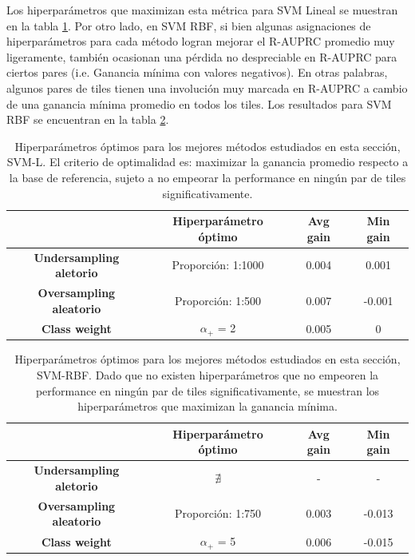 Los hiperparámetros que maximizan esta métrica para SVM Lineal se muestran en la tabla \ref{tab:best_hyp_svml}. Por otro lado, en SVM RBF, si bien algunas asignaciones de hiperparámetros para cada método logran mejorar el R-AUPRC promedio muy ligeramente, también ocasionan una pérdida no despreciable en R-AUPRC para ciertos pares (i.e. Ganancia mínima con valores negativos). En otras palabras, algunos pares de tiles tienen una involución muy marcada en R-AUPRC a cambio de una ganancia mínima promedio en todos los tiles. Los resultados para SVM RBF se encuentran en la tabla \ref{tab:best_hyp_svmk}.


\begin{table}[ht]
\centering
\begin{tabular}{c|c|c|c|}
\cline{2-4}
\textbf{}                                             & \textbf{Hiperparámetro óptimo} & \textbf{Avg gain} & \textbf{Min gain} \\ \hline
\multicolumn{1}{|c|}{\textbf{Undersampling aletorio}} & Proporción: 1:1000       & 0.004             & 0.001            \\ \hline
\multicolumn{1}{|c|}{\textbf{Oversampling aleatorio}} & Proporción: 1:500        & 0.007             & -0.001            \\ \hline
\multicolumn{1}{|c|}{\textbf{Class weight}}           & $\alpha_+$ = 2           & 0.005             & 0            \\ \hline
\end{tabular}
\caption{Hiperparámetros óptimos para los mejores métodos estudiados en esta sección, SVM-L. El criterio de optimalidad es: maximizar la ganancia promedio respecto a la base de referencia, sujeto a no empeorar la performance en ningún par de tiles significativamente.}
\label{tab:best_hyp_svml}
\end{table}

 
\begin{table}[ht]
\centering
\begin{tabular}{c|c|c|c|}
\cline{2-4}
\textbf{}                                             & \textbf{Hiperparámetro óptimo} & \textbf{Avg gain} & \textbf{Min gain} \\ \hline
\multicolumn{1}{|c|}{\textbf{Undersampling aletorio}} &  $\nexists$       &  -       &  - \\ \hline
\multicolumn{1}{|c|}{\textbf{Oversampling aleatorio}} & Proporción: 1:750        &  0.003       & -0.013 \\ \hline
\multicolumn{1}{|c|}{\textbf{Class weight}}           & $\alpha_+$ = 5    & 0.006     & -0.015             \\ \hline
\end{tabular}
\caption{Hiperparámetros óptimos para los mejores métodos estudiados en esta sección, SVM-RBF. Dado que no existen hiperparámetros que no empeoren la performance en ningún par de tiles significativamente, se muestran los hiperparámetros que maximizan la ganancia mínima. }
\label{tab:best_hyp_svmk}
\end{table}

